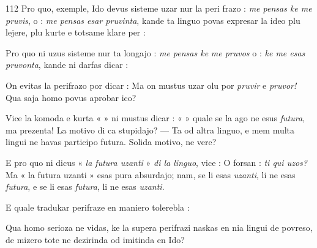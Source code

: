 \begin{VUpage}[116]{112}
\VUinterlignePage{10.18pt}
Pro quo, exemple, Ido devus sisteme uzar nur la peri\cc
frazo : \textit{me pensas ke me pruvis}, o : \textit{me pensas esar pruvinta},\nl
kande ta linguo povas expresar la ideo plu lejere, plu kurte\nl
e totsame klare per : 

Pro quo ni uzus sisteme nur ta longajo : \textit{me pensas ke}\nl
\textit{me pruvos} o : \textit{ke me esas pruvonta}, kande ni darfas dicar :\nl
{}

On evitas la perifrazo por dicar :  Ma\nl
on mustus uzar olu por \textit{pruvir} e \textit{pruvor!} Qua saja homo\nl
povus aprobar ico?

Vice la komoda e kurta «  » \nl
ni mustus dicar : «  » \nl
{} quale se la ago ne esus \textit{futura}, ma prezenta!\nl
La motivo di ca stupidajo? --- Ta od altra linguo, e mem\nl
multa lingui ne havas participo futura. Solida motivo, ne\nl
vere?

E pro quo ni dicus « \textit{la futura uzanti} » \textit{di la linguo}, vice :\nl
{} O forsan : \textit{ti qui uzos?} Ma « la futura\nl
uzanti » esas pura absurdajo; nam, se li esas \textit{uzanti}, li ne\nl
esas \textit{futura}, e se li esas \textit{futura}, li ne esas \textit{uzanti}.

E quale tradukar perifraze en maniero tolerebla : \nl
{}

Qua homo serioza ne vidas, ke la supera perifrazi naskas\nl
en nia lingui de povreso, de mizero tote ne dezirinda od\nl
imitinda en Ido?


\end{VUpage}
